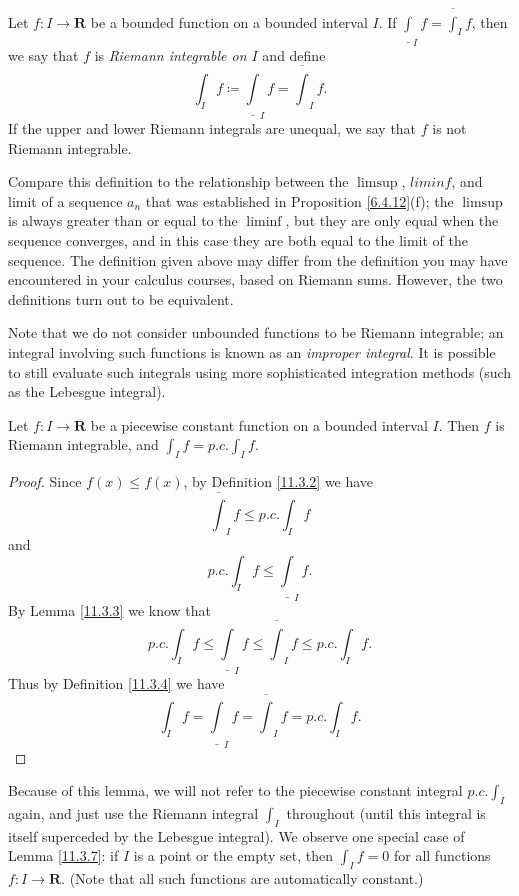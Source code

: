 \begin{definition}\label{11.3.4}
    Let \(f : I \to \mathbf{R}\) be a bounded function on a bounded interval \(I\).
    If \(\underline{\int}_I f = \overline{\int}_I f\), then we say that \(f\) is \emph{Riemann integrable on \(I\)} and define
    \[
        \int_I f \coloneqq \underline{\int}_I f = \overline{\int}_I f.
    \]
    If the upper and lower Riemann integrals are unequal, we say that \(f\) is not Riemann integrable.
\end{definition}

\begin{remark}\label{11.3.5}
    Compare this definition to the relationship between the \(\limsup\), \(liminf\), and limit of a sequence \(a_n\) that was established in Proposition \ref{6.4.12}(f);
    the \(\limsup\) is always greater than or equal to the \(\liminf\), but they are only equal when the sequence converges, and in this case they are both equal to the limit of the sequence.
    The definition given above may differ from the definition you may have encountered in your calculus courses, based on Riemann sums.
    However, the two definitions turn out to be equivalent.
\end{remark}

\begin{remark}\label{11.3.6}
    Note that we do not consider unbounded functions to be Riemann integrable;
    an integral involving such functions is known as an \emph{improper integral}.
    It is possible to still evaluate such integrals using more sophisticated integration methods (such as the Lebesgue integral).
\end{remark}

\begin{lemma}\label{11.3.7}
    Let \(f : I \to \mathbf{R}\) be a piecewise constant function on a bounded interval \(I\).
    Then \(f\) is Riemann integrable, and \(\int_I f = p.c. \int_I f\).
\end{lemma}

\begin{proof}
    Since \(f(x) \leq f(x)\), by Definition \ref{11.3.2} we have
    \[
        \overline{\int}_I f \leq p.c. \int_I f
    \]
    and
    \[
        p.c. \int_I f \leq \underline{\int}_I f.
    \]
    By Lemma \ref{11.3.3} we know that
    \[
        p.c. \int_I f \leq \underline{\int}_I f \leq \overline{\int}_I f \leq p.c. \int_I f.
    \]
    Thus by Definition \ref{11.3.4} we have
    \[
        \int_I f = \underline{\int}_I f = \overline{\int}_I f = p.c. \int_I f.
    \]
\end{proof}

\begin{remark}\label{11.3.8}
    Because of this lemma, we will not refer to the piecewise constant integral \(p.c. \int_I\) again, and just use the Riemann integral \(\int_I\) throughout
    (until this integral is itself superceded by the Lebesgue integral).
    We observe one special case of Lemma \ref{11.3.7}:
    if \(I\) is a point or the empty set, then \(\int_I f = 0\) for all functions \(f : I \to \mathbf{R}\).
    (Note that all such functions are automatically constant.)
\end{remark}